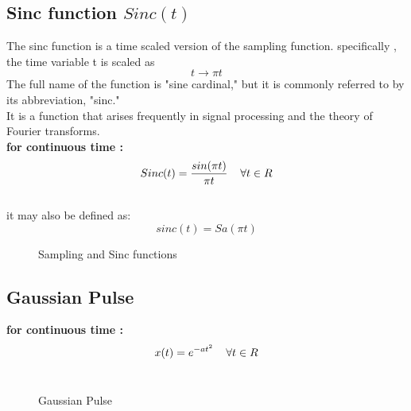 \documentclass[a4paper,12pt]{book}
\begin{document}
\subsection*{Sinc function $Sinc(t)$}
The sinc function is a time scaled version of the sampling function. specifically , the time variable t is scaled as $$t \longrightarrow \pi t$$
The full name of the function is "sine cardinal," but it is commonly referred to by its abbreviation, "sinc."\\ It is a function that arises frequently in signal processing and the theory of Fourier transforms.\\
{\bf for continuous time :}\\
	$$Sinc(t) =\frac{sin(\pi t)}{\pi t} \hspace{4mm} \forall t \in R $$ \\
	it may also be defined as:
	$$sinc(t)=Sa(\pi t)$$
\begin{figure}[h]  
\centering 
{}\hspace{5mm}
\caption{Sampling and Sinc functions} \label{fig:M}  
\end{figure}
\pagebreak
\subsection*{Gaussian Pulse}
{\bf for continuous time :}\\
	$$x(t) =e^{-at^2} \hspace{4mm} \forall t \in R $$ \\
\begin{figure}[h]  
\centering 
{}
\caption{Gaussian Pulse} \label{fig:M}  
\end{figure}
	
\end{document}
